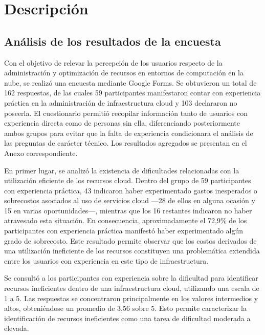 \documentclass[a4paper, 12pt, oneside, openany]{book}
\begin{document}

\chapter{Descripción}

\section{Análisis de los resultados de la encuesta}

Con el objetivo de relevar la percepción de los usuarios respecto de la administración y optimización de recursos en entornos de computación en la nube, se realizó una encuesta mediante Google Forms. Se obtuvieron un total de 162 respuestas, de las cuales 59 participantes manifestaron contar con experiencia práctica en la administración de infraestructura cloud y 103 declararon no poseerla. El cuestionario permitió recopilar información tanto de usuarios con experiencia directa como de personas sin ella, diferenciando posteriormente ambos grupos para evitar que la falta de experiencia condicionara el análisis de las preguntas de carácter técnico. Los resultados agregados se presentan en el Anexo correspondiente.

En primer lugar, se analizó la existencia de dificultades relacionadas con la utilización eficiente de los recursos cloud. Dentro del grupo de 59 participantes con experiencia práctica, 43 indicaron haber experimentado gastos inesperados o sobrecostos asociados al uso de servicios cloud —28 de ellos en alguna ocasión y 15 en varias oportunidades—, mientras que los 16 restantes indicaron no haber atravesado esta situación. En consecuencia, aproximadamente el 72,9\% de los participantes con experiencia práctica manifestó haber experimentado algún grado de sobrecosto. Este resultado permite observar que los costos derivados de una utilización ineficiente de los recursos constituyen una problemática extendida entre los usuarios con experiencia en este tipo de infraestructura.

Se consultó a los participantes con experiencia sobre la dificultad para identificar recursos ineficientes dentro de una infraestructura cloud, utilizando una escala de 1 a 5. Las respuestas se concentraron principalmente en los valores intermedios y altos, obteniéndose un promedio de 3,56 sobre 5. Esto permite caracterizar la identificación de recursos ineficientes como una tarea de dificultad moderada a elevada.
\end{document}
